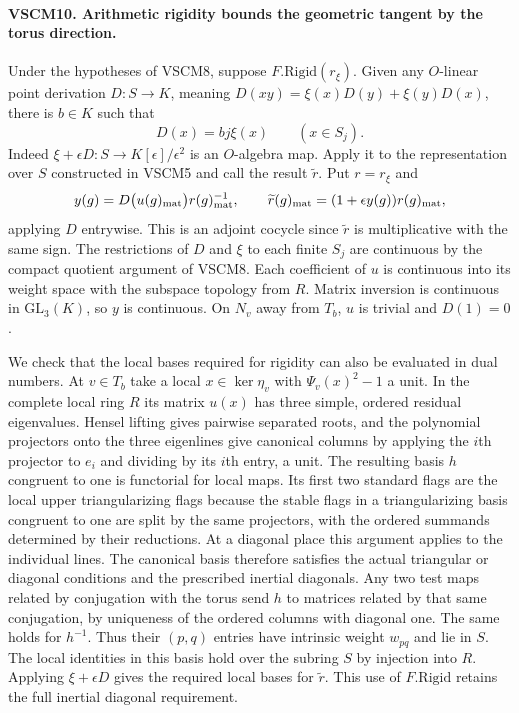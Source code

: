 \paragraph{VSCM10. Arithmetic rigidity bounds the geometric tangent by the torus direction.}
\label{claim:VSCM10}
Under the hypotheses of VSCM8, suppose $F.\mathrm{Rigid}(r_\xi)$.
Given any $O$-linear point derivation $D:S\to K$, meaning
$D(xy)=\xi(x)D(y)+\xi(y)D(x)$, there is $b\in K$ such that
\[
                      D(x)=b j\xi(x)\qquad(x\in S_j).
\]
Indeed $\xi+\epsilon D:S\to K[\epsilon]/\epsilon^2$ is an
$O$-algebra map. Apply it to the representation over $S$ constructed
in VSCM5 and call the result $\widetilde r$. Put $r=r_\xi$ and
\[
 y(g)=D\bigl(u(g)_{\rm mat}\bigr)r(g)_{\rm mat}^{-1},
 \qquad \widetilde r(g)_{\rm mat}=(1+\epsilon y(g))r(g)_{\rm mat},
\]
applying $D$ entrywise. This is an adjoint cocycle since
$\widetilde r$ is multiplicative with the same sign. The restrictions
of $D$ and $\xi$ to each finite $S_j$ are continuous by the compact
quotient argument of VSCM8. Each coefficient of $u$ is continuous
into its weight space with the subspace topology from $R$.
Matrix inversion is continuous in $\mathrm{GL}_3(K)$, so $y$ is
continuous. On $N_v$ away from $T_b$, $u$ is trivial and $D(1)=0$.

We check that the local bases required for rigidity can also be
evaluated in dual numbers. At $v\in T_b$ take a local $x\in\ker\eta_v$
with $\Psi_v(x)^2-1$ a unit. In the complete local ring $R$ its
matrix $u(x)$ has three simple, ordered residual eigenvalues. Hensel
lifting gives pairwise separated roots, and the polynomial projectors
onto the three eigenlines give canonical columns by applying the $i$th
projector to $e_i$ and dividing by its $i$th entry, a unit. The resulting
basis $h$ congruent to one is functorial for local maps. Its first
two standard flags are the local upper triangularizing flags because the
stable flags in a triangularizing basis congruent to one are split
by the same projectors, with the ordered summands determined by
their reductions. At a diagonal place this argument applies to the
individual lines. The canonical basis therefore satisfies the actual
triangular or diagonal conditions and the prescribed inertial
diagonals. Any two test maps related by conjugation with the torus
send $h$ to matrices related by that same conjugation, by uniqueness
of the ordered columns with diagonal one. The same holds for
$h^{-1}$. Thus their $(p,q)$ entries have intrinsic weight $w_{pq}$
and lie in $S$. The local identities in this basis hold over the
subring $S$ by injection into $R$. Applying $\xi+\epsilon D$ gives
the required local bases for $\widetilde r$. This use of
$F.\mathrm{Rigid}$ retains the full inertial diagonal requirement.

